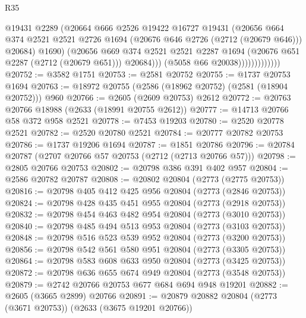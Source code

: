 \begin{lexlean}{R35}
\begin{coremodule}
                                @19431
                                @2289
                                (@20664
                                  @666
                                  @2526
                                  @19422
                                  @16727
                                  @19431
                                  (@20656
                                    @664
                                    @374
                                    @2521
                                    @2521
                                    @2726
                                    @1694
                                    (@20676 @646 @2726 (@2712 (@20679 @646)))
                                    @20684)
                                  @1690)
                                (@20656
                                  @669
                                  @374
                                  @2521
                                  @2521
                                  @2287
                                  @1694
                                  (@20676 @651 @2287 (@2712 (@20679 @651)))
                                  @20684)))
                            (@5058 @66 @20038)))))))))))))
@20752 := @3582 @1751
@20753 := @2581 @20752
@20755 := @1737 @20753 @1694
@20763 := @18972 @20755 (@2586 (@18962 @20752) (@2581 (@18904 @20752))) @960
@20766 := @2605 (@2609 @20753) @2612
@20772 := @20763 @20766 @18988 (@2633 (@18991 @20755 @2612))
@20777 := @14713 @20766 @58 @372 @958 @2521
@20778 := @7453 @19203
@20780 := @2520 @20778 @2521
@20782 := @2520 @20780 @2521
@20784 := @20777 @20782 @20753
@20786 := @1737 @19206 @1694
@20787 := @1851 @20786
@20796 := @20784 @20787 (@2707 @20766 @57 @20753 (@2712 (@2713 @20766 @57)))
@20798 := @2805 @20766 @20753
@20802 := @20798 @386 @391 @402 @957
@20804 := @2586 @20782 @20787
@20808 := @20802 @20804 (@2773 (@2775 @20753))
@20816 := @20798 @405 @412 @425 @956 @20804 (@2773 (@2846 @20753))
@20824 := @20798 @428 @435 @451 @955 @20804 (@2773 (@2918 @20753))
@20832 := @20798 @454 @463 @482 @954 @20804 (@2773 (@3010 @20753))
@20840 := @20798 @485 @494 @513 @953 @20804 (@2773 (@3103 @20753))
@20848 := @20798 @516 @523 @539 @952 @20804 (@2773 (@3200 @20753))
@20856 := @20798 @542 @561 @580 @951 @20804 (@2773 (@3305 @20753))
@20864 := @20798 @583 @608 @633 @950 @20804 (@2773 (@3425 @20753))
@20872 := @20798 @636 @655 @674 @949 @20804 (@2773 (@3548 @20753))
@20879 := @2742 @20766 @20753 @677 @684 @694 @948 @19201
@20882 := @2605 (@3665 @2899) @20766
@20891 := @20879 @20882 @20804 (@2773 (@3671 @20753)) (@2633 (@3675 @19201 @20766))

\end{coremodule}
\end{lexlean}
